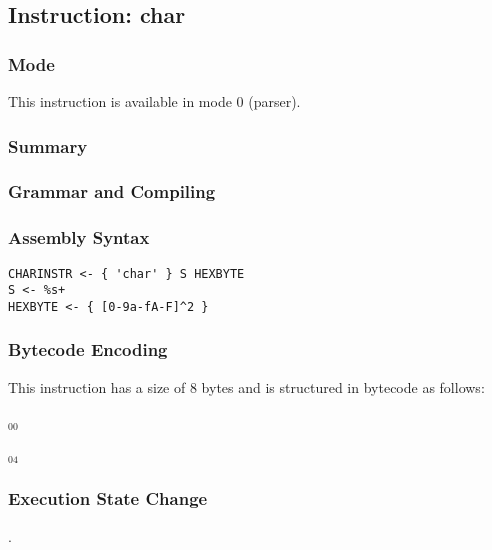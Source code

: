 \subsection{Instruction: char}

\subsubsection{Mode}
This instruction is available in mode 0 (parser).
\subsubsection{Summary}


\subsubsection{Grammar and Compiling}


\subsubsection{Assembly Syntax}

\begin{myquote}
\begin{verbatim}
CHARINSTR <- { 'char' } S HEXBYTE
S <- %s+
HEXBYTE <- { [0-9a-fA-F]^2 }
\end{verbatim}
\end{myquote}

\subsubsection{Bytecode Encoding}

This instruction has a size of 8 bytes and is structured in bytecode as follows:

$_{00}$\ 



$_{04}$\ 


\subsubsection{Execution State Change}

.


